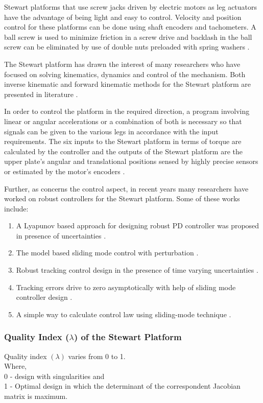 Stewart platforms that use screw jacks driven by electric motors as leg actuators have the advantage of being light and easy to control. Velocity and position control for these platforms can be done using shaft encoders and tachometers. A ball screw is used to minimize friction in a screw drive and backlash in the ball screw can be eliminated by use of double nuts preloaded with spring washers \cite{fichter1986stewart}.

The Stewart platform has drawn the interest of many researchers who have focused on solving kinematics, dynamics and control of the mechanism. Both inverse kinematic and forward kinematic methods for the Stewart platform are presented in literature
\cite{csumnu2017simulation}.

In order to control the platform in the required direction, a program involving linear or angular accelerations or a combination of both is necessary so that signals can be given to the various legs in accordance with the input requirements. The six inputs to the Stewart platform in terms of torque are calculated by the controller and the outputs of the Stewart platform are the upper plate's angular and translational positions sensed by highly precise sensors or estimated by the motor's encoders \cite{iqbal_dynamic_2008}.

Further, as concerns the control aspect, in recent years many researchers have worked on robust controllers for the Stewart platform. Some of these works include:
\begin{enumerate}
\item A Lyapunov based approach for designing robust PD controller was proposed in presence of uncertainties 
\cite{kang1996robust}.
\item The model based sliding mode control with perturbation 
\cite{kang1996robust}.
\item Robust tracking control design in the presence of time varying
uncertainties 
\cite{kim1998high}.
\item Tracking errors drive to zero asymptotically with help of sliding mode
controller design 
\cite{huang2004sliding}.
\item A simple way to calculate control law using sliding-mode technique 
\cite{iqbal2006direct}.
\end{enumerate}
\subsubsection{Quality Index ($\lambda$) of the Stewart Platform}
Quality index $(\lambda)$ varies from 0 to 1.\\
 Where,\\
 0 - design with singularities and\\
 1 - Optimal design in which the determinant of the correspondent Jacobian matrix is maximum.
 
